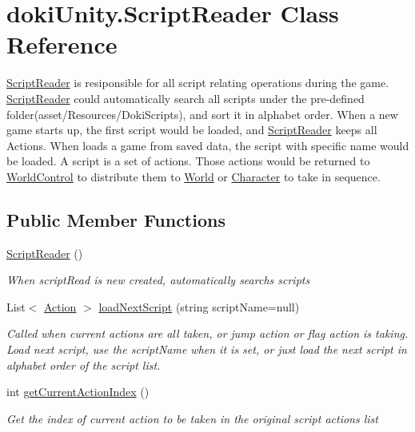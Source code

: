 \hypertarget{classdoki_unity_1_1_script_reader}{}\section{doki\+Unity.\+Script\+Reader Class Reference}
\label{classdoki_unity_1_1_script_reader}


\hyperlink{classdoki_unity_1_1_script_reader}{Script\+Reader} is resiponsible for all script relating operations during the game. \hyperlink{classdoki_unity_1_1_script_reader}{Script\+Reader} could automatically search all scripts under the pre-\/defined folder(asset/\+Resources/\+Doki\+Scripts), and sort it in alphabet order. When a new game starts up, the first script would be loaded, and \hyperlink{classdoki_unity_1_1_script_reader}{Script\+Reader} keeps all Actions. When loads a game from saved data, the script with specific name would be loaded. A script is a set of actions. Those actions would be returned to \hyperlink{classdoki_unity_1_1_world_control}{World\+Control} to distribute them to \hyperlink{classdoki_unity_1_1_world}{World} or \hyperlink{classdoki_unity_1_1_character}{Character} to take in sequence.  


\subsection*{Public Member Functions}
\begin{DoxyCompactItemize}
\item 
\hyperlink{classdoki_unity_1_1_script_reader_a160a5172d896f0bdf7730e0500bb1bb2}{Script\+Reader} ()
\begin{DoxyCompactList}\small\item\em When script\+Read is new created, automatically searchs scripts \end{DoxyCompactList}\item 
List$<$ \hyperlink{classdoki_script_setting_1_1_action}{Action} $>$ \hyperlink{classdoki_unity_1_1_script_reader_ac186e09e6b0f1391bdcd1b253766896f}{load\+Next\+Script} (string script\+Name=null)
\begin{DoxyCompactList}\small\item\em Called when current actions are all taken, or jump action or flag action is taking. Load next script, use the script\+Name when it is set, or just load the next script in alphabet order of the script list. \end{DoxyCompactList}\item 
int \hyperlink{classdoki_unity_1_1_script_reader_ad0c02f5c03bc0c6deb074131be94e949}{get\+Current\+Action\+Index} ()
\begin{DoxyCompactList}\small\item\em Get the index of current action to be taken in the original script actions\textquotesingle{} list \end{DoxyCompactList}\end{DoxyCompactItemize}
